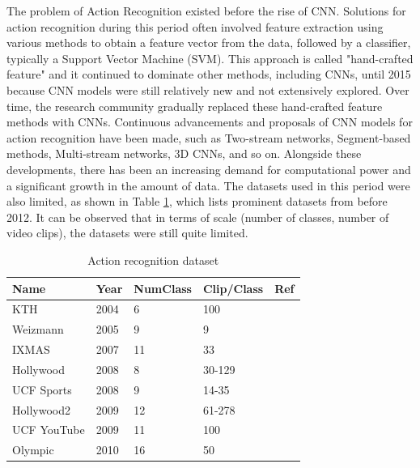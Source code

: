 \documentclass[10pt,onecolumn,letterpaper]{article}
\begin{document}
The problem of Action Recognition existed before the rise of CNN. Solutions for
action recognition during this period often involved feature extraction using
various methods to obtain a feature vector from the data, followed by a
classifier, typically a Support Vector Machine (SVM). This approach is called
"hand-crafted feature" and it continued to dominate other methods, including
CNNs, until 2015 because CNN models were still relatively new and not
extensively explored. Over time, the research community gradually replaced these
hand-crafted feature methods with CNNs. Continuous advancements and proposals of
CNN models for action recognition have been made, such as Two-stream networks,
Segment-based methods, Multi-stream networks, 3D CNNs, and so on. Alongside
these developments, there has been an increasing demand for computational power
and a significant growth in the amount of data. The datasets used in this period
were also limited, as shown in Table \ref{config}, which lists prominent
datasets from before 2012. It can be observed that in terms of scale (number of
classes, number of video clips), the datasets were still quite limited.

\begin{table}[h]
	\centering
	\caption{Action recognition dataset}
	\begin{tabular}{l|l l l l}
		\toprule
		Name & Year & NumClass & Clip/Class & Ref \\
		\midrule
		KTH & 2004 & 6 & 100 & \cite{KTH} \\
		Weizmann & 2005 & 9 & 9 & \cite{Weizmann} \\
		IXMAS & 2007 & 11 & 33 & \cite{IXMAS} \\
		Hollywood & 2008 & 8 & 30-129 & \cite{HollyWood} \\
		UCF Sports & 2008 & 9 & 14-35 & \cite{UCFSports} \\
		Hollywood2 & 2009 & 12 & 61-278 & \cite{Hollywood2} \\
		UCF YouTube & 2009 & 11 & 100 & \cite{UCFYouTube} \\
		Olympic & 2010 & 16 & 50 & \cite{Olympic} \\
		\bottomrule
	\end{tabular}%
	\label{config}
\end{table}%
\end{document}
